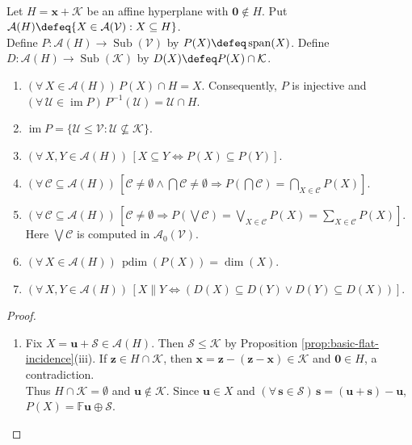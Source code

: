 \begin{theorem} \label{thm:linear-span-map-affine-to-projective} \\
Let $H=\mathbf{x}+\mathcal{K}$ be an affine hyperplane with $\mathbf{0}\notin H$. Put $\mathcal{A}(H)\defeq\{X\in\mathcal{A}(\mathcal{V}):X\subseteq H\}$.\\
Define $P:\mathcal{A}(H)\to\operatorname{Sub}(\mathcal{V})$ by $P(X)\defeq\operatorname{span}(X)$. Define $D:\mathcal{A}(H)\to\operatorname{Sub}(\mathcal{K})$ by $D(X)\defeq P(X)\cap\mathcal{K}$.
\begin{enumerate}[label=(\roman*)]
\setlength{\itemsep}{0pt}
\item $(\forall\,X\in\mathcal{A}(H))\,P(X)\cap H=X$. Consequently, $P$ is injective and $(\forall\,\mathcal{U}\in\operatorname{im}P)\,P^{-1}(\mathcal{U})=\mathcal{U}\cap H$.
\item $\operatorname{im}P=\{\mathcal{U}\leq\mathcal{V}:\mathcal{U}\nsubseteq\mathcal{K}\}$.
\item $(\forall\,X,Y\in\mathcal{A}(H))\,[X\subseteq Y\iff P(X)\subseteq P(Y)]$.
\item $(\forall\,\mathcal{C}\subseteq\mathcal{A}(H))\,[\mathcal{C}\neq\emptyset\land\bigcap\mathcal{C}\neq\emptyset\Rightarrow P(\bigcap\mathcal{C})=\bigcap\limits_{X\in\mathcal{C}}P(X)]$.
\item $(\forall\,\mathcal{C}\subseteq\mathcal{A}(H))\,[\mathcal{C}\neq\emptyset\Rightarrow P(\bigvee\mathcal{C})=\bigvee\limits_{X\in\mathcal{C}}P(X)=\sum\limits_{X\in\mathcal{C}}P(X)]$. Here $\bigvee\mathcal{C}$ is computed in $\mathcal{A}_0(\mathcal{V})$.
\item $(\forall\,X\in\mathcal{A}(H))\,\operatorname{pdim}(P(X))=\dim(X)$.
\item $(\forall\,X,Y\in\mathcal{A}(H))\,[X\parallel Y\iff(D(X)\subseteq D(Y)\lor D(Y)\subseteq D(X))]$.
\end{enumerate}
\begin{proof}
\begin{enumerate}[label=(\roman*)]
\setlength{\itemsep}{0pt}
\item[$(i)$] Fix $X=\mathbf{u}+\mathcal{S}\in\mathcal{A}(H)$. Then $\mathcal{S}\leq\mathcal{K}$ by Proposition \ref{prop:basic-flat-incidence}(iii). If $\mathbf{z}\in H\cap\mathcal{K}$, then $\mathbf{x}=\mathbf{z}-(\mathbf{z}-\mathbf{x})\in\mathcal{K}$ and $\mathbf{0}\in H$, a contradiction.\\
Thus $H\cap\mathcal{K}=\emptyset$ and $\mathbf{u}\notin\mathcal{K}$. Since $\mathbf{u}\in X$ and $(\forall\,\mathbf{s}\in\mathcal{S})\,\mathbf{s}=(\mathbf{u}+\mathbf{s})-\mathbf{u}$, $P(X)=\mathbb{F}\mathbf{u}\oplus\mathcal{S}$.\\

\end{enumerate}
\end{proof}
\end{theorem}
